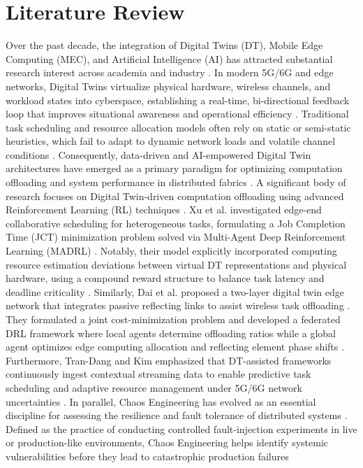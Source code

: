 \documentclass[twoside,twocolumn,10pt]{article}
\begin{document}
\section{Literature Review} \fontsize{11}{13}\selectfont
Over the past decade, the integration of Digital Twins (DT), Mobile Edge Computing (MEC), and Artificial Intelligence (AI) has attracted substantial research interest across academia and industry
. In modern 5G/6G and edge networks, Digital Twins virtualize physical hardware, wireless channels, and workload states into cyberspace, establishing a real-time, bi-directional feedback loop that improves situational awareness and operational efficiency
. Traditional task scheduling and resource allocation models often rely on static or semi-static heuristics, which fail to adapt to dynamic network loads and volatile channel conditions
. Consequently, data-driven and AI-empowered Digital Twin architectures have emerged as a primary paradigm for optimizing computation offloading and system performance in distributed fabrics
.
A significant body of research focuses on Digital Twin-driven computation offloading using advanced Reinforcement Learning (RL) techniques
. Xu et al. \cite{xu2023} investigated edge-end collaborative scheduling for heterogeneous tasks, formulating a Job Completion Time (JCT) minimization problem solved via Multi-Agent Deep Reinforcement Learning (MADRL)
. Notably, their model explicitly incorporated computing resource estimation deviations between virtual DT representations and physical hardware, using a compound reward structure to balance task latency and deadline criticality
. Similarly, Dai et al. \cite{dai2024} proposed a two-layer digital twin edge network that integrates passive reflecting links to assist wireless task offloading
. They formulated a joint cost-minimization problem and developed a federated DRL framework where local agents determine offloading ratios while a global agent optimizes edge computing allocation and reflecting element phase shifts
. Furthermore, Tran-Dang and Kim \cite{tran2025} emphasized that DT-assisted frameworks continuously ingest contextual streaming data to enable predictive task scheduling and adaptive resource management under 5G/6G network uncertainties
.
In parallel, Chaos Engineering has evolved as an essential discipline for assessing the resilience and fault tolerance of distributed systems
. Defined as the practice of conducting controlled fault-injection experiments in live or production-like environments, Chaos Engineering helps identify systemic vulnerabilities before they lead to catastrophic production failures
\end{document}
